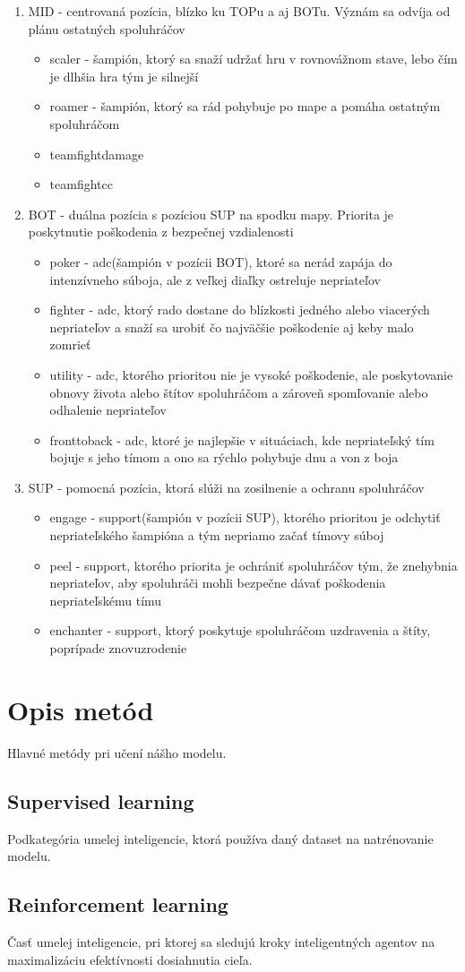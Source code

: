 \begin{enumerate}
\begin{itemize}
	\end{itemize}
	\item MID - centrovaná pozícia, blízko ku TOPu a aj BOTu. Význám sa odvíja od plánu ostatných spoluhráčov
	\begin{itemize}
		\item scaler - šampión, ktorý sa snaží udržať hru v rovnovážnom stave, lebo čím je dlhšia hra tým je silnejší
		\item roamer - šampión, ktorý sa rád pohybuje po mape a pomáha ostatným spoluhráčom
		\item teamfightdamage 
		\item teamfightcc 
	\end{itemize}
	\item BOT - duálna pozícia s pozíciou SUP na spodku mapy. Priorita je poskytnutie poškodenia z bezpečnej vzdialenosti
	\begin{itemize}
		\item poker - adc(šampión v pozícii BOT), ktoré sa nerád zapája do intenzívneho súboja, ale z veľkej diaľky ostreluje nepriateľov
		\item fighter - adc, ktorý rado dostane do blízkosti jedného alebo viacerých nepriateľov a snaží sa urobiť čo najväčšie poškodenie aj keby malo zomrieť 
		\item utility - adc, ktorého prioritou nie je vysoké poškodenie, ale poskytovanie obnovy života alebo štítov spoluhráčom a zároveň spomľovanie alebo odhalenie nepriateľov
		\item fronttoback - adc, ktoré je najlepšie v situáciach, kde nepriateľský tím bojuje s jeho tímom a ono sa rýchlo pohybuje dnu a von z boja
	\end{itemize}
\item SUP - pomocná pozícia, ktorá slúži na zosilnenie a ochranu spoluhráčov
\begin{itemize}
	\item engage - support(šampión v pozícii SUP), ktorého prioritou je odchytiť nepriateľského šampióna a tým nepriamo začať tímovy súboj
	\item peel - support, ktorého priorita je ochrániť spoluhráčov tým, že znehybnia nepriateľov, aby spoluhráči mohli bezpečne dávať poškodenia nepriateľskému tímu
	\item enchanter - support, ktorý poskytuje spoluhráčom uzdravenia a štíty, poprípade znovuzrodenie
\end{itemize}
\end{enumerate}
\section{Opis metód}
Hlavné metódy pri učení nášho modelu.
\subsection{Supervised learning}
Podkategória umelej inteligencie, ktorá používa daný dataset na natrénovanie modelu.

\subsection{Reinforcement learning}
Časť umelej inteligencie, pri ktorej sa sledujú kroky inteligentných agentov na maximalizáciu efektívnosti dosiahnutia cieľa.
